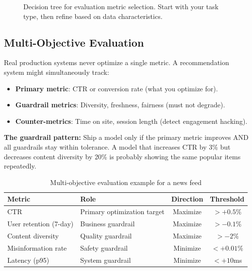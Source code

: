 \begin{figure}[H]
\caption{Decision tree for evaluation metric selection. Start with your task type, then refine based on data characteristics.}
\label{fig:metric_decision_tree}
\end{figure}

\subsection{Multi-Objective Evaluation}

Real production systems never optimize a single metric. A recommendation system might simultaneously track:
\begin{itemize}
    \item \textbf{Primary metric}: CTR or conversion rate (what you optimize for).
    \item \textbf{Guardrail metrics}: Diversity, freshness, fairness (must not degrade).
    \item \textbf{Counter-metrics}: Time on site, session length (detect engagement hacking).
\end{itemize}

\textbf{The guardrail pattern:} Ship a model only if the primary metric improves AND all guardrails stay within tolerance. A model that increases CTR by 3\% but decreases content diversity by 20\% is probably showing the same popular items repeatedly.

\begin{table}[H]
\centering
\caption{Multi-objective evaluation example for a news feed}
\begin{tabularx}{\textwidth}{lXcc}
\toprule
\textbf{Metric} & \textbf{Role} & \textbf{Direction} & \textbf{Threshold} \\
\midrule
CTR & Primary optimization target & Maximize & $> +0.5\%$ \\
User retention (7-day) & Business guardrail & Maximize & $> -0.1\%$ \\
Content diversity & Quality guardrail & Maximize & $> -2\%$ \\
Misinformation rate & Safety guardrail & Minimize & $< +0.01\%$ \\
Latency (p95) & System guardrail & Minimize & $< +10$ms \\
\bottomrule
\end{tabularx}
\end{table}

